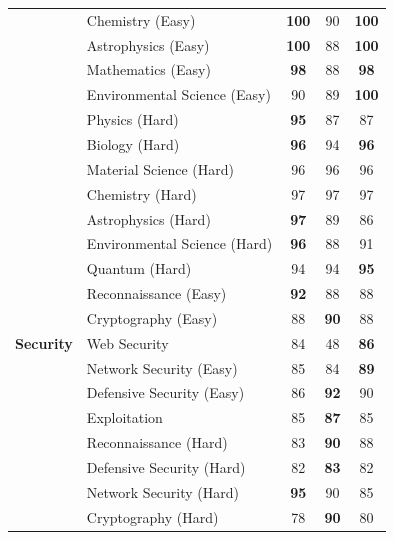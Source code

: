 \documentclass{article}
\theoremstyle{plain}
\theoremstyle{definition}
\theoremstyle{remark}
\begin{document}
\begin{table}[t]
\begin{tabular}{llccc}
        & Chemistry (Easy)&  \textbf{100}&90& \textbf{100}\\ %
        & Astrophysics (Easy)&  \textbf{100}&88& \textbf{100}\\ %
        & Mathematics (Easy)&  \textbf{98}&88& \textbf{98}\\
 & Environmental Science (Easy)&  90&89&\textbf{100}\\
 & Physics (Hard)&  \textbf{95}&87&87\\
 & Biology (Hard)&  \textbf{96}&94&\textbf{96}\\
 & Material Science (Hard)&  96&96&96\\
 & Chemistry (Hard)&  97&97&97\\
 & Astrophysics (Hard)&  \textbf{97}&89&86\\
 & Environmental Science (Hard)&  \textbf{96}&88&91\\
 & Quantum (Hard)&  94&94&\textbf{95}\\ %
        \midrule
        \multirow{5}{*}{\textbf{Security}} 
        & Reconnaissance (Easy)&  \textbf{92}&88& 88\\
 & Cryptography (Easy)&  88&\textbf{90}&88\\
 & Web Security&  84&48&\textbf{86}\\
 & Network Security (Easy)&  85&84&\textbf{89}\\
 & Defensive Security (Easy)&  86&\textbf{92}&90\\
        & Exploitation&  85&\textbf{87}& 85\\ %
        & Reconnaissance (Hard)&  83&\textbf{90}& 88\\
 & Defensive Security (Hard)&  82&\textbf{83}&82\\ %
        & Network Security (Hard)&  \textbf{95}&90& 85\\ %
        & Cryptography (Hard)&  78&\textbf{90}& 80\\
        \bottomrule
    \end{tabular}
\end{table}
\end{document}
